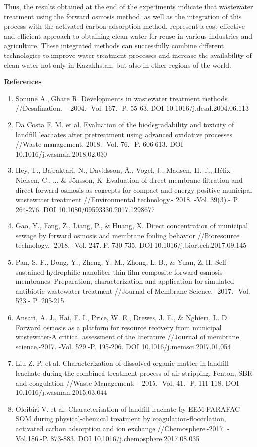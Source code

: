 Thus, the results obtained at the end of the experiments indicate that
wastewater treatment using the forward osmosis method, as well as the
integration of this process with the activated carbon adsorption method,
represent a cost-effective and efficient approach to obtaining clean
water for reuse in various industries and agriculture. These integrated
methods can successfully combine different technologies to improve water
treatment processes and increase the availability of clean water not
only in Kazakhstan, but also in other regions of the world.

{\bfseries References}

\begin{enumerate}
\def\labelenumi{\arabic{enumi}.}
\item
  Sonune A., Ghate R. Developments in wastewater treatment methods
  //Desalination. -- 2004. -Vol. 167. -P. 55-63. DOI
  10.1016/j.desal.2004.06.113
\item
  Da Costa F. M. et al. Evaluation of the biodegradability and toxicity
  of landfill leachates after pretreatment using advanced oxidative
  processes //Waste management.-2018. -Vol. 76.- P. 606-613. DOI
  10.1016/j.wasman.2018.02.030
\item
  Hey, T., Bajraktari, N., Davidsson, Å., Vogel, J., Madsen, H. T.,
  Hélix-Nielsen, C., ... \& Jönsson, K. Evaluation of direct membrane
  filtration and direct forward osmosis as concepts for compact and
  energy-positive municipal wastewater treatment //Environmental
  technology.- 2018. -Vol. 39(3).- P. 264-276. DOI
  10.1080/09593330.2017.1298677
\item
  Gao, Y., Fang, Z., Liang, P., \& Huang, X. Direct concentration of
  municipal sewage by forward osmosis and membrane fouling behavior
  //Bioresource technology. -2018. -Vol. 247.-P. 730-735. DOI
  10.1016/j.biortech.2017.09.145
\item
  Pan, S. F., Dong, Y., Zheng, Y. M., Zhong, L. B., \& Yuan, Z. H.
  Self-sustained hydrophilic nanofiber thin film composite forward
  osmosis membranes: Preparation, characterization and application for
  simulated antibiotic wastewater treatment //Journal of Membrane
  Science.- 2017. -Vol. 523.- P. 205-215.
\item
  Ansari, A. J., Hai, F. I., Price, W. E., Drewes, J. E., \& Nghiem, L.
  D. Forward osmosis as a platform for resource recovery from municipal
  wastewater-A critical assessment of the literature //Journal of
  membrane science.-2017. -Vol. 529.-P. 195-206. DOI
  10.1016/j.memsci.2017.01.054
\item
  Liu Z. P. et al. Characterization of dissolved organic matter in
  landfill leachate during the combined treatment process of air
  stripping, Fenton, SBR and coagulation //Waste Management. - 2015.
  -Vol. 41. -P. 111-118. DOI 10.1016/j.wasman.2015.03.044
\item
  Oloibiri V. et al. Characterisation of landfill leachate by
  EEM-PARAFAC-SOM during physical-chemical treatment by
  coagulation-flocculation, activated carbon adsorption and ion exchange
  //Chemosphere.-2017. -Vol.186.-P. 873-883. DOI
  10.1016/j.chemosphere.2017.08.035
\end{enumerate}

